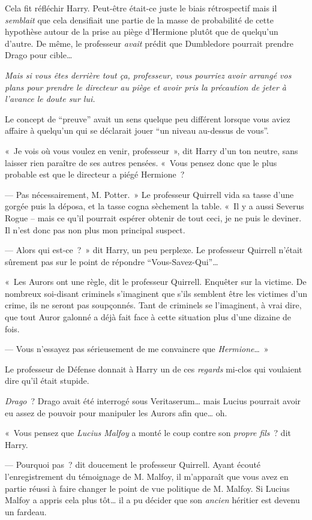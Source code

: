 Cela fit réfléchir Harry. Peut-être était-ce juste le biais rétrospectif mais il \emph{semblait} que cela densifiait une partie de la masse de probabilité de cette hypothèse autour de la prise au piège d'Hermione plutôt que de quelqu'un d'autre. De même, le professeur \emph{avait} prédit que Dumbledore pourrait prendre Drago pour cible…

\emph{Mais si vous êtes derrière tout ça, professeur, vous pourriez avoir arrangé vos plans pour prendre le directeur au piège et avoir pris la précaution de jeter à l'avance le doute sur lui.}

Le concept de “preuve” avait un sens quelque peu différent lorsque vous aviez affaire à quelqu'un qui se déclarait jouer “un niveau au-dessus de vous”.

«~Je vois où vous voulez en venir, professeur~», dit Harry d'un ton neutre, sans laisser rien paraître de ses autres pensées. «~Vous pensez donc que le plus probable est que le directeur a piégé Hermione~?

--- Pas nécessairement, M. Potter.~» Le professeur Quirrell vida sa tasse d'une gorgée puis la déposa, et la tasse cogna sèchement la table. «~Il y a aussi Severus Rogue -- mais ce qu'il pourrait espérer obtenir de tout ceci, je ne puis le deviner. Il n'est donc pas non plus mon principal suspect.

--- Alors qui est-ce~?~» dit Harry, un peu perplexe. Le professeur Quirrell n'était sûrement pas sur le point de répondre “Vous-Savez-Qui”…

«~Les Aurors ont une règle, dit le professeur Quirrell. Enquêter sur la victime. De nombreux soi-disant criminels s'imaginent que s'ils semblent être les victimes d'un crime, ils ne seront pas soupçonnés. Tant de criminels se l'imaginent, à vrai dire, que tout Auror galonné a déjà fait face à cette situation plus d'une dizaine de fois.

--- Vous n'essayez pas sérieusement de me convaincre que \emph{Hermione}…~»

Le professeur de Défense donnait à Harry un de ces \emph{regards} mi-clos qui voulaient dire qu'il était stupide.

\emph{Drago}~? Drago avait été interrogé sous Veritaserum… mais Lucius pourrait avoir eu assez de pouvoir pour manipuler les Aurors afin que… oh.

«~Vous pensez que \emph{Lucius Malfoy} a monté le coup contre son \emph{propre fils}~? dit Harry.

--- Pourquoi pas~? dit doucement le professeur Quirrell. Ayant écouté l'enregistrement du témoignage de M. Malfoy, il m'apparaît que vous avez en partie réussi à faire changer le point de vue politique de M. Malfoy. Si Lucius Malfoy a appris cela plus tôt… il a pu décider que son \emph{ancien} héritier est devenu un fardeau.

